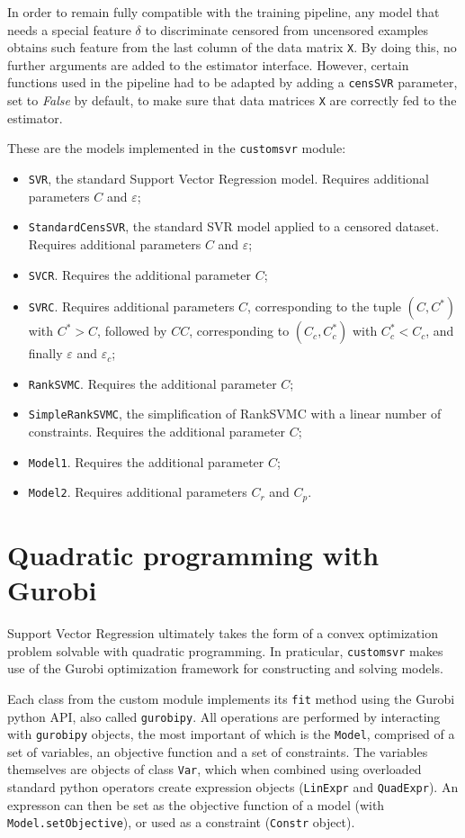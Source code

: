 \documentclass[12pt]{report}
\begin{document}
In order to remain fully compatible with the training pipeline, any model that needs a special feature $\delta$ to discriminate censored from uncensored examples obtains such feature from the last column of the data matrix \texttt{X}. By doing this, no further arguments are added to the estimator interface. However, certain functions used in the pipeline had to be adapted by adding a \texttt{censSVR} parameter, set to \textit{False} by default, to make sure that data matrices \texttt{X} are correctly fed to the estimator.

These are the models implemented in the \texttt{customsvr} module:
\begin{itemize}
\item \texttt{SVR}, the standard Support Vector Regression model. Requires additional parameters $C$ and $\varepsilon$;
\item \texttt{StandardCensSVR}, the standard SVR model applied to a censored dataset. Requires additional parameters $C$ and $\varepsilon$;
\item \texttt{SVCR}. Requires the additional parameter $C$;
\item \texttt{SVRC}. Requires additional parameters $C$, corresponding to the tuple $(C,C^{*})$ with $C^{*} > C$, followed by $CC$, corresponding to $(C_{c},C_{c}^{*})$ with $C_{c}^{*} < C_{c}$, and finally $\varepsilon$ and $\varepsilon_{c}$;
\item \texttt{RankSVMC}. Requires the additional parameter $C$;
\item \texttt{SimpleRankSVMC}, the simplification of RankSVMC with a linear number of constraints. Requires the additional parameter $C$;
\item \texttt{Model1}. Requires the additional parameter $C$;
\item \texttt{Model2}. Requires additional parameters $C_{r}$ and $C_{p}$.
\end{itemize}

\section{Quadratic programming with Gurobi}
Support Vector Regression ultimately takes the form of a convex optimization problem solvable with quadratic programming. In praticular, \texttt{customsvr} makes use of the Gurobi optimization framework for constructing and solving models.

Each class from the custom module implements its \texttt{fit} method using the Gurobi python API, also called \texttt{gurobipy}. All operations are performed by interacting with \texttt{gurobipy} objects, the most important of which is the \texttt{Model}, comprised of a set of variables, an objective function and a set of constraints. The variables themselves are objects of class \texttt{Var}, which when combined using overloaded standard python operators create expression objects (\texttt{LinExpr} and \texttt{QuadExpr}). An expresson can then be set as the objective function of a model (with \texttt{Model.setObjective}), or used as a constraint (\texttt{Constr} object).
\end{document}
